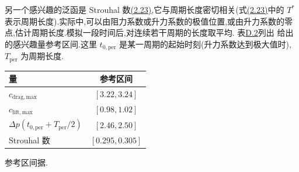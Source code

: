 \begin{example}[定常入口下 $\mathrm{Re}=100$ 的非定常圆柱绕流]
另一个感兴趣的泛函是 Strouhal 数\hyperref[eq:dimensionless-parameters]{(2.23)},它与周期长度密切相关(式\hyperref[eq:dimensionless-parameters]{(2.23)}中的 $T^*$ 表示周期长度).实际中,可以由阻力系数或升力系数的极值位置,或由升力系数的零点,估计周期长度.模拟一段时间后,对连续若干周期的长度取平均.
表\hyperref[tab:appendix-d-2]{D.2}列出\textcite{SchaeferTurek1996} 给出的感兴趣量参考区间.这里 $t_{0,\mathrm{per}}$ 是某一周期的起始时刻(升力系数达到极大值时),$T_{\mathrm{per}}$ 为周期长度.
\begin{eleganttable}
\label{tab:appendix-d-2}
\begin{tabular}{lc}
\toprule
量 & 参考区间\\
\midrule
$c_{\mathrm{drag,max}}$ & $[3.22,3.24]$\\
$c_{\mathrm{lift,max}}$ & $[0.98,1.02]$\\
$\Delta p(t_{0,\mathrm{per}}+T_{\mathrm{per}}/2)$ & $[2.46,2.50]$\\
Strouhal 数 & $[0.295,0.305]$\\
\bottomrule
\end{tabular}
\par\smallskip
\parbox{0.9\linewidth}{\centering 参考区间据\textcite{SchaeferTurek1996}.}
\end{eleganttable}
\end{example}

